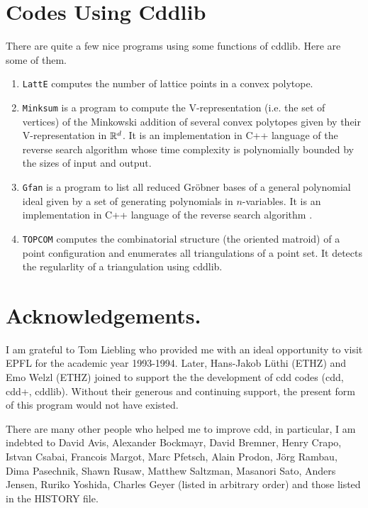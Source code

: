 \documentclass[11pt]{article}
\newcommand {\0} {{\bf 0}}
\newcommand{\R}{{\Bbb R}}
\begin{document}
\section{Codes Using Cddlib}  \label{USERCODES}

There are quite a few nice programs using some functions of cddlib.  
Here are some of them.


\begin{enumerate}

\item {\tt LattE} \cite{dhhhty-latte-05} computes the number of lattice points
in a convex polytope.

\item {\tt Minksum} \cite{w-msv-05} is a program to compute the V-representation
(i.e. the set of vertices) of the Minkowski addition of several convex polytopes
given by their V-representation in $\R^d$.  It is an implementation in C++ language 
of the reverse search algorithm \cite{f-fzctmacp-04} whose time complexity is
polynomially bounded by the sizes of input and output.

\item {\tt Gfan} \cite{j-gvum-05} is a program to list all reduced Gr\"obner
bases of a general polynomial ideal given by a set of generating polynomials
in $n$-variables.   It is an implementation in C++ language 
of the reverse search algorithm \cite{fjt-cgf-05}.


\item {\tt TOPCOM} \cite{r-topcom-05} computes the combinatorial structure
(the oriented matroid) of a point configuration and enumerates all triangulations
of a point set.   It detects the regularlity of a triangulation using cddlib.

\end{enumerate}


\section*{Acknowledgements.} 
I am  grateful to Tom  Liebling who
provided me with an ideal opportunity to visit EPFL
for the academic year 1993-1994.  Later, Hans-Jakob L\"uthi (ETHZ) and 
Emo Welzl  (ETHZ) joined to support the 
the development of cdd codes (cdd, cdd+, cddlib).
Without their generous and continuing support, the present form of 
this program would not have existed.

There are many other people who helped me to improve cdd, in particular,
I am indebted to  David Avis, 
Alexander Bockmayr, David Bremner, Henry Crapo, Istvan Csabai, 
Francois Margot, Marc Pfetsch, Alain Prodon, J\"org Rambau, Dima Pasechnik,
Shawn Rusaw, Matthew Saltzman, Masanori Sato, Anders Jensen,
Ruriko Yoshida, Charles Geyer (listed in arbitrary order) and those listed
in the HISTORY file.




\end{document}

